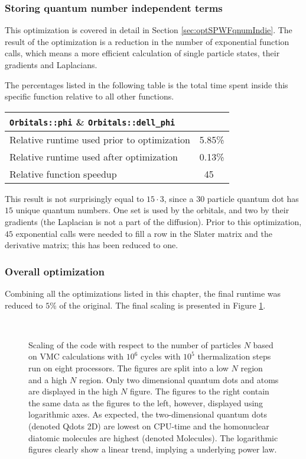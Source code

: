 \subsubsection{Storing quantum number independent terms}

This optimization is covered in detail in Section \ref{sec:optSPWFqnumIndie}. The result of the optimization is a reduction in the number of exponential function calls, which means a more efficient calculation of single particle states, their gradients and Laplacians.

The percentages listed in the following table is the total time spent inside this specific function relative to all other functions. 

\begin{tabular}{ll}
 \verb+Orbitals::phi+ \& \verb+Orbitals::dell_phi+ & \\
 \hline\hline
 Relative runtime used prior to optimization & 5.85\% \\
 Relative runtime used after optimization    & 0.13\% \\
 \hline
 Relative function speedup                   & ~45
\end{tabular}

This result is not surprisingly equal to $15\cdot 3$, since a $30$ particle quantum dot has $15$ unique quantum numbers. One set is used by the orbitals, and two by their gradients (the Laplacian is not a part of the diffusion). Prior to this optimization, $45$ exponential calls were needed to fill a row in the Slater matrix and the derivative matrix; this has been reduced to one.

\subsubsection{Overall optimization}

Combining all the optimizations listed in this chapter, the final runtime was reduced to $5\%$ of the original. The final scaling is presented in Figure \ref{fig:scaling}.

\begin{figure}[h]
 \begin{center}
   \\
  \caption{Scaling of the code with respect to the number of particles $N$ based on VMC calculations with $10^6$ cycles with $10^5$ thermalization steps run on eight processors. The figures are split into a low $N$ region and a high $N$ region. Only two dimensional quantum dots and atoms are displayed in the high $N$ figure. The figures to the right contain the same data as the figures to the left, however, displayed using logarithmic axes. As expected, the two-dimensional quantum dots (denoted Qdots 2D) are lowest on CPU-time and the homonuclear diatomic molecules are highest (denoted Molecules). The logarithmic figures clearly show a linear trend, implying a underlying power law.}
  \label{fig:scaling}
 \end{center}
\end{figure}

